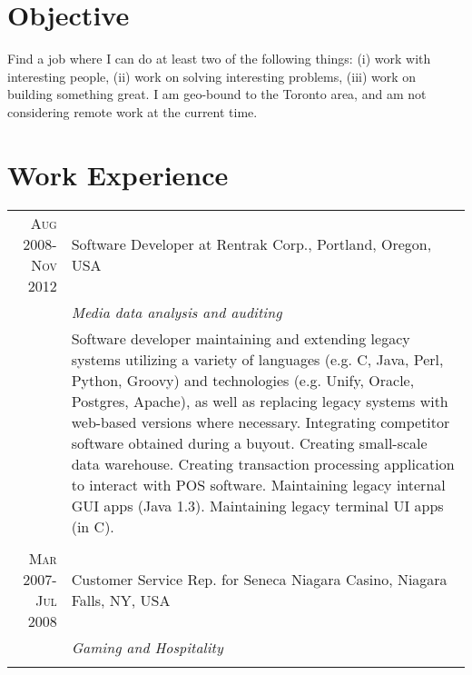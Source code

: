 {{{{    %
    \section{Objective}
    Find a job where I can do at least two of the following things: (i) work with
    interesting people, (ii) work on solving interesting problems, (iii) work on
    building something great. I am geo-bound to the Toronto area, and am not
    considering remote work at the current time.

    \section{Work Experience}
    \begin{tabular}{r|p{11cm}}
        \textsc{Aug 2008-Nov 2012}  & Software Developer at Rentrak Corp., Portland, Oregon, USA\\
                                    & \emph{Media data analysis and auditing}\\
                                    & \fontsize{9pt}{10pt}\selectfont
                                            Software developer maintaining and extending legacy systems utilizing a variety
                                            of languages (e.g. C, Java, Perl, Python, Groovy) and technologies (e.g. Unify,
                                            Oracle, Postgres, Apache), as well as replacing legacy systems with web-based
                                            versions where necessary. Integrating competitor software obtained during a
                                            buyout. Creating small-scale data warehouse. Creating transaction processing
                                            application to interact with POS software. Maintaining legacy internal GUI apps
                                            (Java 1.3). Maintaining legacy terminal UI apps (in C). \\
    \multicolumn{2}{c}{}\\
        \textsc{Mar 2007-Jul 2008}   & Customer Service Rep. for Seneca Niagara Casino, Niagara Falls, NY, USA\\
                                        &\emph{Gaming and Hospitality}\\
                                        & \fontsize{9pt}{10pt}\selectfont

\end{tabular}}}}}
